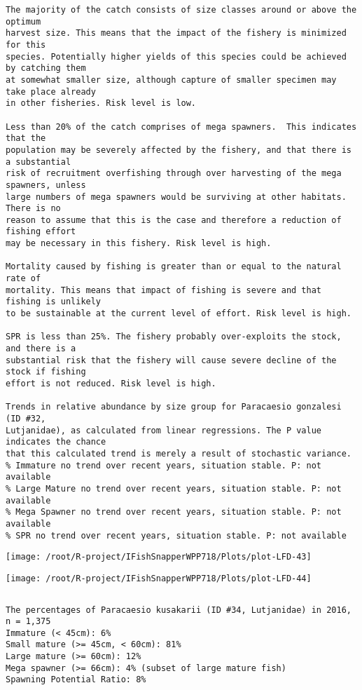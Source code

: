 \documentclass{report}\usepackage[]{graphicx}\usepackage[]{color}
\makeatletter
\def\maxwidth{ %
  \ifdim\Gin@nat@width>\linewidth
    \linewidth
  \else
    \Gin@nat@width
  \fi
}
\newenvironment{kframe}{%
 \def\at@end@of@kframe{}%
 \ifinner\ifhmode%
  \def\at@end@of@kframe{\end{minipage}}%
  \begin{minipage}{\columnwidth}%
 \fi\fi%
 \def\FrameCommand##1{\hskip\@totalleftmargin \hskip-\fboxsep
 \colorbox{shadecolor}{##1}\hskip-\fboxsep
     \hskip-\linewidth \hskip-\@totalleftmargin \hskip\columnwidth}%
 \MakeFramed {\advance\hsize-\width
   \@totalleftmargin\z@ \linewidth\hsize
   \@setminipage}}%
 {\par\unskip\endMakeFramed%
 \at@end@of@kframe}
\newenvironment{knitrout}{}{} %
\makeatother
\begin{document}
\begin{knitrout}
\begin{kframe}
\begin{verbatim}
The majority of the catch consists of size classes around or above the optimum
harvest size. This means that the impact of the fishery is minimized for this
species. Potentially higher yields of this species could be achieved by catching them
at somewhat smaller size, although capture of smaller specimen may take place already
in other fisheries. Risk level is low.

Less than 20% of the catch comprises of mega spawners.  This indicates that the
population may be severely affected by the fishery, and that there is a substantial
risk of recruitment overfishing through over harvesting of the mega spawners, unless
large numbers of mega spawners would be surviving at other habitats. There is no
reason to assume that this is the case and therefore a reduction of fishing effort
may be necessary in this fishery. Risk level is high.
 
Mortality caused by fishing is greater than or equal to the natural rate of
mortality. This means that impact of fishing is severe and that fishing is unlikely
to be sustainable at the current level of effort. Risk level is high.
 
SPR is less than 25%. The fishery probably over-exploits the stock, and there is a
substantial risk that the fishery will cause severe decline of the stock if fishing
effort is not reduced. Risk level is high.
 
Trends in relative abundance by size group for Paracaesio gonzalesi (ID #32,
Lutjanidae), as calculated from linear regressions. The P value indicates the chance
that this calculated trend is merely a result of stochastic variance.
% Immature no trend over recent years, situation stable. P: not available
% Large Mature no trend over recent years, situation stable. P: not available
% Mega Spawner no trend over recent years, situation stable. P: not available
% SPR no trend over recent years, situation stable. P: not available
\end{verbatim}
\end{kframe}
\texttt{[image: /root/R-project/IFishSnapperWPP718/Plots/plot-LFD-43]} 

\texttt{[image: /root/R-project/IFishSnapperWPP718/Plots/plot-LFD-44]} 
\begin{kframe}\begin{verbatim}
\end{verbatim}
\end{kframe}
\clearpage
\newpage
\begin{kframe}\begin{verbatim}The percentages of Paracaesio kusakarii (ID #34, Lutjanidae) in 2016, n = 1,375
Immature (< 45cm): 6%
Small mature (>= 45cm, < 60cm): 81%
Large mature (>= 60cm): 12%
Mega spawner (>= 66cm): 4% (subset of large mature fish)
Spawning Potential Ratio: 8%
 

\end{verbatim}
\end{kframe}
\end{knitrout}
\end{document}
